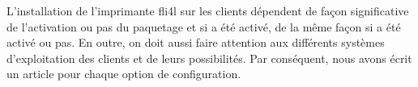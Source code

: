 
    L'installation de l'imprimante fli4l sur les clients dépendent de façon
    significative de l'activation ou pas du paquetage 
    et si  a été activé, de la même façon
    si  a été activé ou pas.
    En outre, on doit aussi faire attention aux différents systèmes d'exploitation
    des clients et de leurs possibilités. Par conséquent, nous avons écrit un
    article pour chaque option de configuration.


